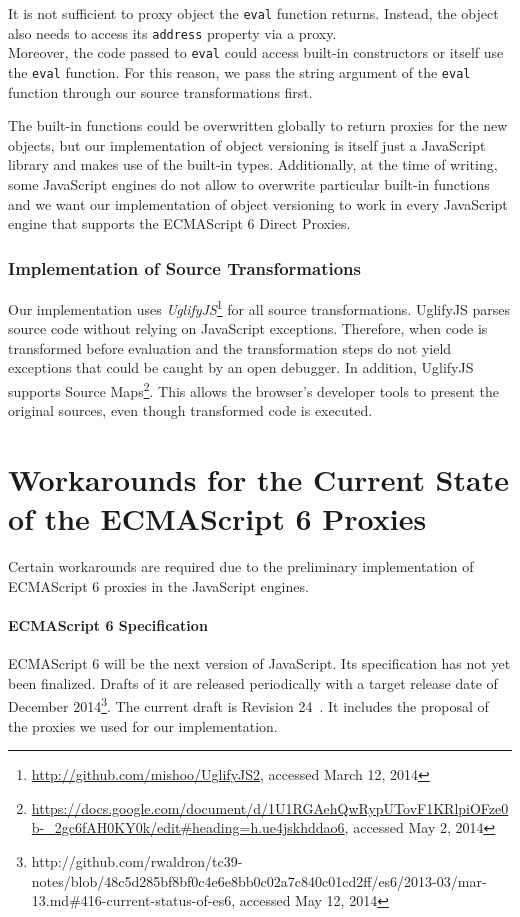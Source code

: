 It is not sufficient to proxy object the \lstinline{eval} function returns.
Instead, the object also needs to access its \lstinline{address} property via a proxy.\\
Moreover, the code passed to \lstinline{eval} could access built-in constructors or itself use the \lstinline{eval} function.
For this reason, we pass the string argument of the \lstinline{eval} function through our source transformations first.

The built-in functions could be overwritten globally to return proxies for the new objects, but our implementation of object versioning is itself just a JavaScript library and makes use of the built-in types.
Additionally, at the time of writing, some JavaScript engines do not allow to overwrite particular built-in functions and we want our implementation of object versioning to work in every JavaScript engine that supports the ECMAScript 6 Direct Proxies.

\subsubsection{Implementation of Source Transformations}

Our implementation uses \emph{UglifyJS}\footnote{\url{http://github.com/mishoo/UglifyJS2}, accessed March 12, 2014} for all source transformations.
UglifyJS parses source code without relying on JavaScript exceptions.
Therefore, when code is transformed before evaluation and the transformation steps do not yield exceptions that could be caught by an open debugger.
In addition, UglifyJS supports Source Maps\footnote{\url{https://docs.google.com/document/d/1U1RGAehQwRypUTovF1KRlpiOFze0b-_2gc6fAH0KY0k/edit\#heading=h.ue4jskhddao6}, accessed May 2, 2014}.
This allows the browser's developer tools to present the original sources, even though transformed code is executed.





\section{Workarounds for the Current State of the ECMAScript 6 Proxies} \label{sec:IMPLEMENTATION:4}

Certain workarounds are required due to the preliminary implementation of ECMAScript 6 proxies in the JavaScript engines.

\paragraph{ECMAScript 6 Specification}
ECMAScript 6 will be the next version of JavaScript.
Its specification has not yet been finalized.
Drafts of it are released periodically with a target release date of December 2014\footnote{http://github.com/rwaldron/tc39-notes/blob/48c5d285bf8bf0c4e6e8bb0c02a7c840c01cd2ff/es6/2013-03/mar-13.md\#416-current-status-of-es6, accessed May 12, 2014}.
The current draft is Revision 24~\cite{Ecma2014ES6}.
It includes the proposal of the proxies we used for our implementation.

